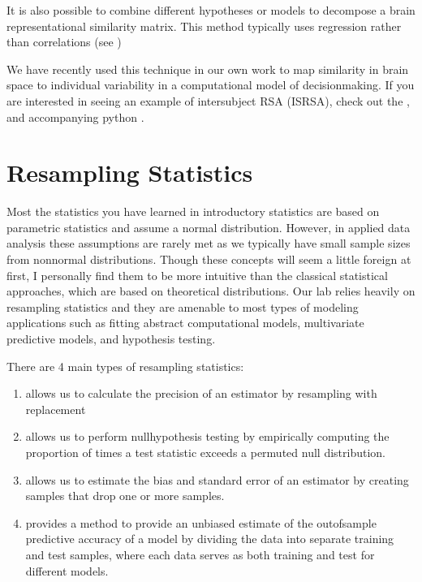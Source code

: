 \documentclass[letterpaper,10pt,english]{sphinxmanual}
\begin{document}
It is also possible to combine different hypotheses or models to decompose a brain representational similarity matrix. This method typically uses regression rather than correlations (see )

We have recently used this technique in our own work to map similarity in brain space to individual variability in a computational model of decision\sphinxhyphen{}making. If you are interested in seeing an example of intersubject RSA (IS\sphinxhyphen{}RSA), check out the , and accompanying python .


\section{Resampling Statistics}
\label{\detokenize{content/Resampling_Statistics:resampling-statistics}}\label{\detokenize{content/Resampling_Statistics::doc}}

Most the statistics you have learned in introductory statistics are based on parametric statistics and assume a normal distribution. However, in applied data analysis these assumptions are rarely met as we typically have small sample sizes from non\sphinxhyphen{}normal distributions. Though these concepts will seem a little foreign at first, I personally find them to be more intuitive than the classical statistical approaches, which are based on theoretical distributions. Our lab relies heavily on resampling statistics and they are amenable to most types of modeling applications such as fitting abstract computational models, multivariate predictive models, and hypothesis testing.

There are 4 main types of resampling statistics:
\begin{enumerate}
%
\item {} 
 allows us to calculate the precision of an estimator by resampling with replacement

\item {} 
 allows us to perform null\sphinxhyphen{}hypothesis testing by empirically computing the proportion of times a test statistic exceeds a permuted null distribution.

\item {} 
 allows us to estimate the bias and standard error of an estimator by creating samples that drop one or more samples.

\item {} 
 provides a method to provide an unbiased estimate of the out\sphinxhyphen{}of\sphinxhyphen{}sample predictive accuracy of a model by dividing the data into separate training and test samples, where each data serves as both training and test for different models.

\end{enumerate}
\end{document}
